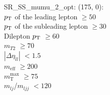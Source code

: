SR\_SS\_mumu\_2\_opt: (175, 0): \\
$p_{\text{T}}$ of the leading lepton $\geq 50$ \\
$p_{\text{T}}$ of the subleading lepton $\geq 30$ \\
Dilepton $p_{\text{T}}$ $\geq 60$ \\
$m_{T2}$ $\geq 70$ \\
$|\Delta\eta_{ll}|$ $<1.5$ \\
$m_{\text{eff}}$ $\geq 200$ \\
$m_{\text{T}}^{\text{max}}$ $\geq 75$ \\
$m_{lj}$/$m_{ljj}$ $<120$ \\
